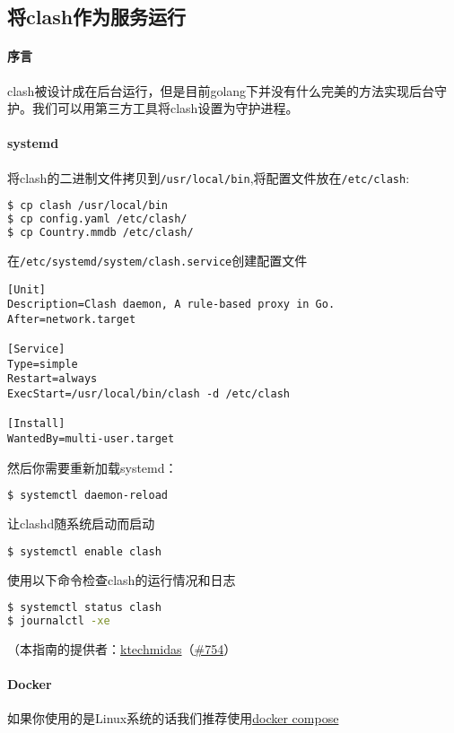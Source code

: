 \subsection{将clash作为服务运行}

\paragraph{序言}clash被设计成在后台运行，但是目前golang下并没有什么完美的方法实现后台守护。我们可以用第三方工具将clash设置为守护进程。

\paragraph{systemd} 将clash的二进制文件拷贝到\verb|/usr/local/bin|,将配置文件放在\verb|/etc/clash|:
\begin{lstlisting}[breaklines=true,language=sh]
$ cp clash /usr/local/bin
$ cp config.yaml /etc/clash/
$ cp Country.mmdb /etc/clash/
\end{lstlisting}

在\verb|/etc/systemd/system/clash.service|创建配置文件

\begin{lstlisting}[breaklines=true]
[Unit]
Description=Clash daemon, A rule-based proxy in Go.
After=network.target

[Service]
Type=simple
Restart=always
ExecStart=/usr/local/bin/clash -d /etc/clash

[Install]
WantedBy=multi-user.target
\end{lstlisting}

然后你需要重新加载systemd：
\begin{lstlisting}[breaklines=true,language=sh]
$ systemctl daemon-reload
\end{lstlisting}
让clashd随系统启动而启动
\begin{lstlisting}[breaklines=true,language=sh]
$ systemctl enable clash
\end{lstlisting}
使用以下命令检查clash的运行情况和日志
\begin{lstlisting}[breaklines=true,language=sh]
$ systemctl status clash
$ journalctl -xe
\end{lstlisting}
（本指南的提供者：\href{https://github.com/ktechmidas}{ktechmidas}（\href{https://github.com/Dreamacro/clash/issues/754}{\#754}）

\paragraph{Docker} 如果你使用的是Linux系统的话我们推荐使用\href{https://docs.docker.com/compose/}{docker compose}

